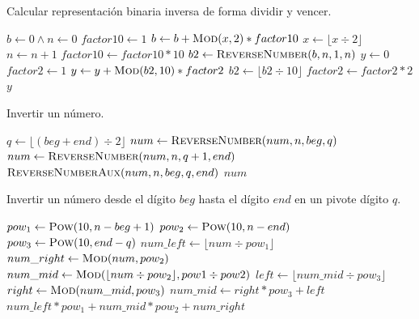 \documentclass[letter]{article}
\begin{document}
\begin{algorithm}[!ht]
\caption{Calcular representación binaria inversa de forma dividir y vencer.}
\begin{algorithmic}[1] 
    \State $b \leftarrow 0 \land n \leftarrow 0$
    \State $factor10 \leftarrow 1$
        \State $b \leftarrow b + \Call{Mod}{x, 2} * factor10$
        \State $x \leftarrow \lfloor x \div 2 \rfloor$
        \State $n \leftarrow n + 1$
        \State $factor10 \leftarrow factor10 * 10$
    \EndWhile
    \State $b2 \leftarrow \Call{ReverseNumber}{b, n, 1, n}$
    \State $y \leftarrow 0$
    \State $factor2 \leftarrow 1$
        \State $y \leftarrow y + \Call{Mod}{b2, 10} * factor2$
        \State $b2 \leftarrow \lfloor b2 \div 10 \rfloor$
        \State $factor2 \leftarrow factor2 * 2$
    \EndWhile
    \State \Return $y$
\EndProcedure
\end{algorithmic}
\end{algorithm}

\begin{algorithm}[!ht]
\caption{Invertir un número.}
\begin{algorithmic}[1] 
        \State $q \leftarrow \lfloor (beg + end) \div 2 \rfloor$
        \State $num \leftarrow \Call{ReverseNumber}{num, n, beg, q}$
        \State $num \leftarrow \Call{ReverseNumber}{num, n, q + 1, end}$
        \State \Return $\Call{ReverseNumberAux}{num, n, beg, q, end}$
    \Else
        \State \Return $num$
    \EndIf
\EndProcedure
\end{algorithmic}
\end{algorithm}

\begin{algorithm}[!ht]
\caption{Invertir un número desde el dígito $beg$ hasta el dígito $end$ en un pivote dígito $q$.}
\begin{algorithmic}[1] 
    \State $pow_1 \leftarrow \Call{Pow}{10, n - beg + 1}$
    \State $pow_2 \leftarrow \Call{Pow}{10, n - end}$
    \State $pow_3 \leftarrow \Call{Pow}{10, end - q}$
    \State $num\_left \leftarrow \lfloor num \div pow_1 \rfloor$
    \State $num\_right \leftarrow  \Call{Mod}{num, pow_2}$
    \State $num\_mid \leftarrow \Call{Mod}{\lfloor num \div pow_2 \rfloor, pow1 \div pow2}$
    \State $left \leftarrow \lfloor num\_mid \div pow_3 \rfloor$
    \State $right \leftarrow \Call{Mod}{num\_mid, pow_3}$
    \State $num\_mid \leftarrow right * pow_3 + left$
    \State \Return $num\_left * pow_1 + num\_mid * pow_2 + num\_right$
\EndProcedure
\end{algorithmic}
\end{algorithm}
\end{document}
